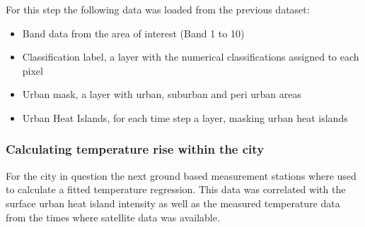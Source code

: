 \documentclass[12pt,a4paper, english]{article}
\begin{document}
    For this step the following data was loaded from the previous dataset: 
    \begin{itemize}
      \item Band data from the area of interest (Band 1 to 10)
      \item Classification label, a layer with the numerical classifications assigned to each pixel 
      \item Urban mask, a layer with urban, suburban and peri urban areas
      \item Urban Heat Islands, for each time step a layer, masking urban heat islands
    \end{itemize}

    \subsubsection{Calculating temperature rise within the city}
    For the city in question the next ground based measurement stations where used to calculate a fitted temperature regression. 
    This data %
    was correlated with the surface urban heat island intensity as well as the measured temperature data from the times where satellite data was available. 

%
%
\end{document}

